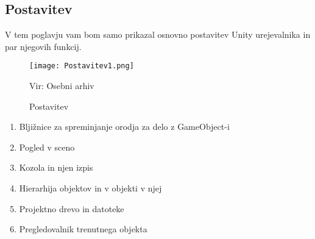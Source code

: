 {\color{indiagreen}\subsection{Postavitev}}
V tem poglavju vam bom samo prikazal osnovno postavitev Unity urejevalnika in par njegovih funkcij.
\begin{figure}[ht!]
	\centering
	\texttt{[image: Postavitev1.png]}
	\caption{Postavitev}
	{\tiny Vir: Osebni arhiv}
\end{figure}
\begin{enumerate}
	\item Bljižnice za spreminjanje orodja za delo z GameObject-i
	\item Pogled v sceno
	\item Kozola in njen izpis
	\item Hierarhija objektov in v objekti v njej
	\item Projektno drevo in datoteke
	\item Pregledovalnik trenutnega objekta
\end{enumerate}